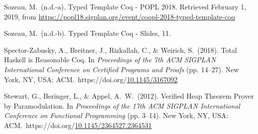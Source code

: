 \documentclass[12pt,twoside]{article}
\begin{document}
{\begin{thebibliography}{222}
\mdbibitemlabel{[Sozeau, n.d.-a]}Sozeau, M.~(n.d.-a). Typed Template Coq - POPL 2018. Retrieved February 1, 2019, from \href{https://popl18.sigplan.org/event/coqpl-2018-typed-template-coq}{{\ttfamily https://\hspace{0pt}popl18.\hspace{0pt}sigplan.\hspace{0pt}org/\hspace{0pt}event/\hspace{0pt}coqpl-\hspace{0pt}2018-\hspace{0pt}typed-\hspace{0pt}template-\hspace{0pt}coq}}\label{sozeau_typed_nodate}%

\mdbibitemlabel{[Sozeau, n.d.-b]}Sozeau, M.~(n.d.-b). Typed Template Coq - Slides, 11.\label{sozeau_typed_nodate-1}%

Spector-Zabusky, A., Breitner, J., Rizkallah, C., \& Weirich, S.~(2018). Total Haskell is Reasonable Coq. In \emph{Proceedings of the 7th ACM SIGPLAN International Conference on Certified Programs and Proofs} (pp. 14–27). New York, NY, USA: ACM.~https://doi.org/\href{https://dx.doi.org/10.1145/3167092}{10.1145/3167092}\label{spector-zabusky_total_2018}%

Stewart, G., Beringer, L., \& Appel, A.~W.~(2012). Verified Heap Theorem Prover by Paramodulation. In \emph{Proceedings of the 17th ACM SIGPLAN International Conference on Functional Programming} (pp. 3–14). New York, NY, USA: ACM.~https://doi.org/\href{https://dx.doi.org/10.1145/2364527.2364531}{10.1145/2364527.2364531}\label{stewart_verified_2012}%


\end{thebibliography}}
\end{document}
